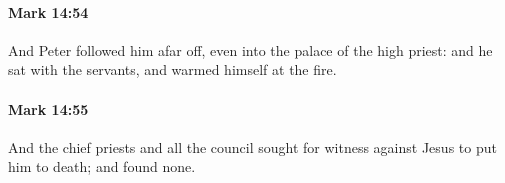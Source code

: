 		\paragraph{Mark 14:54} %
			\label{MARK-14-54}

			And Peter followed him afar off, even into the palace of the high priest: and he sat with the servants, and warmed himself at the fire.

			\begin{framed}
			\scriptsize
				\begin{compactdesc}
					\item[SBLG] 
				\end{compactdesc}
			\end{framed}

		\paragraph{Mark 14:55} %
			\label{MARK-14-55}

			And the chief priests and all the council sought for witness against Jesus to put him to death; and found none.

